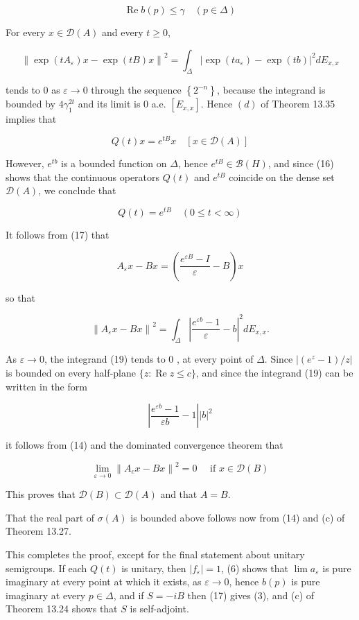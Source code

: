 \documentclass[10pt]{article}
\begin{document}
$$
\operatorname{Re} b(p) \leq \gamma \quad(p \in \Delta)
$$

For every $x \in \mathscr{D}(A)$ and every $t \geq 0$,

$$
\left\|\exp \left(t A_{\varepsilon}\right) x-\exp (t B) x\right\|^{2}=\int_{\Delta}\left|\exp \left(t a_{\varepsilon}\right)-\exp (t b)\right|^{2} d E_{x, x}
$$

tends to 0 as $\varepsilon \rightarrow 0$ through the sequence $\left\{2^{-n}\right\}$, because the integrand is bounded by $4 \gamma_{1}^{2 t}$ and its limit is 0 a.e. $\left[E_{x, x}\right]$. Hence $(d)$ of Theorem 13.35 implies that

$$
Q(t) x=e^{t B} x \quad[x \in \mathscr{D}(A)]
$$

However, $e^{t b}$ is a bounded function on $\Delta$, hence $e^{t B} \in \mathscr{B}(H)$, and since (16) shows that the continuous operators $Q(t)$ and $e^{t B}$ coincide on the dense set $\mathscr{D}(A)$, we conclude that

$$
Q(t)=e^{t B} \quad(0 \leq t<\infty)
$$

It follows from (17) that

$$
A_{\varepsilon} x-B x=\left(\frac{e^{\varepsilon B}-I}{\varepsilon}-B\right) x
$$

so that

$$
\left\|A_{\varepsilon} x-B x\right\|^{2}=\int_{\Delta}\left|\frac{e^{\varepsilon b}-1}{\varepsilon}-b\right|^{2} d E_{x, x} .
$$

As $\varepsilon \rightarrow 0$, the integrand (19) tends to 0 , at every point of $\Delta$. Since $\left|\left(e^{z}-1\right) / z\right|$ is bounded on every half-plane $\{z: \operatorname{Re} z \leq c\}$, and since the integrand (19) can be written in the form

$$
\left|\frac{e^{\varepsilon b}-1}{\varepsilon b}-1\right||b|^{2}
$$

it follows from (14) and the dominated convergence theorem that

$$
\lim _{\varepsilon \rightarrow 0}\left\|A_{c} x-B x\right\|^{2}=0 \quad \text { if } x \in \mathscr{D}(B)
$$

This proves that $\mathscr{D}(B) \subset \mathscr{D}(A)$ and that $A=B$.

That the real part of $\sigma(A)$ is bounded above follows now from (14) and (c) of Theorem 13.27.

This completes the proof, except for the final statement about unitary semigroups. If each $Q(t)$ is unitary, then $\left|f_{\varepsilon}\right|=1$, (6) shows that $\lim a_{\varepsilon}$ is pure
imaginary at every point at which it exists, as $\varepsilon \rightarrow 0$, hence $b(p)$ is pure imaginary at every $p \in \Delta$, and if $S=-i B$ then (17) gives (3), and (c) of Theorem 13.24 shows that $S$ is self-adjoint.
\end{document}
